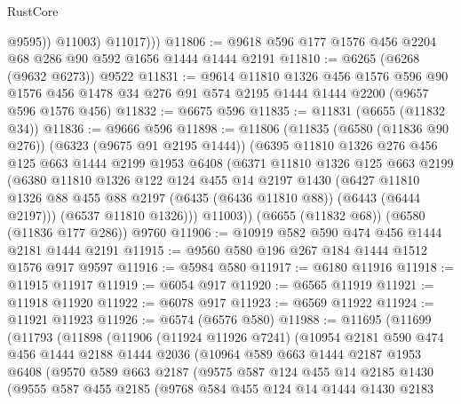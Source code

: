 \begin{lexlean}{RustCore}
\begin{coremodule}
{\begin{coremodule}
{{{{{{{{{{{{{{{{{{{{{{{{{{{{{{{{{{{{{{{{{{{{{                @9595))
            @11003)
          @11017)))
@11806 := @9618 @596 @177 @1576 @456 @2204 @68 @286 @90 @592 @1656 @1444 @1444 @2191
@11810 := @6265 (@6268 (@9632 @6273)) @9522
@11831 := @9614
    @11810
    @1326
    @456
    @1576
    @596
    @90
    @1576
    @456
    @1478
    @34
    @276
    @91
    @574
    @2195
    @1444
    @1444
    @2200
    (@9657 @596 @1576 @456)
@11832 := @6675 @596
@11835 := @11831 (@6655 (@11832 @34))
@11836 := @9666 @596
@11898 := @11806
    (@11835
      (@6580 (@11836 @90 @276))
      (@6323 (@9675 @91 @2195 @1444))
      (@6395
        @11810
        @1326
        @276
        @456
        @125
        @663
        @1444
        @2199
        @1953
        @6408
        (@6371
          @11810
          @1326
          @125
          @663
          @2199
          (@6380
            @11810
            @1326
            @122
            @124
            @455
            @14
            @2197
            @1430
            (@6427 @11810 @1326 @88 @455 @88 @2197 (@6435 (@6436 @11810 @88)) (@6443 (@6444 @2197)))
            (@6537 @11810 @1326)))
        @11003))
    (@6655 (@11832 @68))
    (@6580 (@11836 @177 @286))
    @9760
@11906 := @10919 @582 @590 @474 @456 @1444 @2181 @1444 @2191
@11915 := @9560 @580 @196 @267 @184 @1444 @1512 @1576 @917 @9597
@11916 := @5984 @580
@11917 := @6180 @11916
@11918 := @11915 @11917
@11919 := @6054 @917
@11920 := @6565 @11919
@11921 := @11918 @11920
@11922 := @6078 @917
@11923 := @6569 @11922
@11924 := @11921 @11923
@11926 := @6574 (@6576 @580)
@11988 := @11695
    (@11699
      (@11793
        (@11898
          (@11906
            (@11924 @11926 @7241)
            (@10954
              @2181
              @590
              @474
              @456
              @1444
              @2188
              @1444
              @2036
              (@10964
                @589
                @663
                @1444
                @2187
                @1953
                @6408
                (@9570
                  @589
                  @663
                  @2187
                  (@9575
                    @587
                    @124
                    @455
                    @14
                    @2185
                    @1430
                    (@9555
                      @587
                      @455
                      @2185
                      (@9768
                        @584
                        @455
                        @124
                        @14
                        @1444
                        @1430
                        @2183
}}}}}}}}}}}}}}}}}}}}}}}}}}}}}}}}}}}}}}}}}}}}}
\end{coremodule}}
\end{coremodule}
\end{lexlean}
